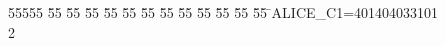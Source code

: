 %
%
\begin{tabbing}
55555 \= 55 \= 55 \= 55 \= 55 \= 55 \= 55 \= 55 \= 55 \= 55 \= 55 \= 55 \= 55 \= \>ALICE\_C1=401404033101\\[0pt]
2\>\end{tabbing}
